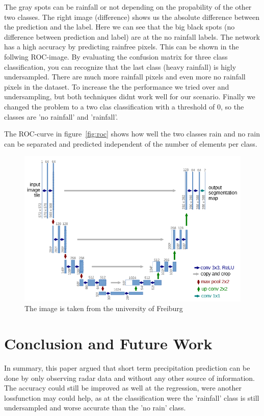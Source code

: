 \documentclass[oneside]{htwg-report}
\begin{document}
The gray spots can be rainfall or not depending on the propability of the other two classes. The right image (difference) shows us the absolute difference between the prediction and the label.
Here we can see that the big black spots (no difference between prediction and label) are at the no rainfall labels.
The network has a high accuracy by predicting rainfree pixels. This can be shown in the follwing ROC-image. 
By evaluating the confusion matrix for three class classification, you can recognize that the last class (heavy rainfall) is higly undersampled. 
There are much more rainfall pixels and even more no rainfall pixels in the dataset. To increase the the performance we tried over and undersampling, but both techniques didnt work well for our scenario.
Finally we changed the problem to a two clas classification with a threshold of 0, so the classes are 'no rainfall' and 'rainfall'.

The ROC-curve in figure~\ref{fig:roc} shows how well the two classes rain and no rain can be separated and predicted independent of the number of elements per class.

\begin{figure}[ht]
    \centering
    \includegraphics[width=0.8\linewidth]{../pics/UNet_Biomedical}
    \caption{The image is taken from the university of Freiburg~\cite{ronneberger2015u}}
\end{figure}

\section*{Conclusion and Future Work}
In summary, this paper argued that short term precipitation prediction can be done by only observing radar data and without any other source of information.
The accuracy could still be improved as well at the regression, were another lossfunction may could help, as at the classification were the 'rainfall' class is still undersampled and worse accurate than the 'no rain' class.
\end{document}
